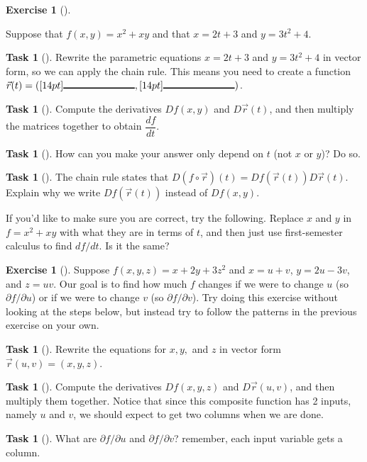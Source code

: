 \documentclass[10pt,]{book}
\theoremstyle{plain}
\theoremstyle{definition}
\theoremstyle{definition}
\theoremstyle{definition}
\theoremstyle{definition}
\newtheorem{exploration}[project]{Exercise}
\newtheorem{task}[project]{Task}
\theoremstyle{definition}
\numberwithin{equation}{section}
\newcommand{\blank}[1]{[14pt]{\rule{#1}{1pt}}}
\begin{document}
\begin{exploration}[]\label{exploration-154}
%
\par
Suppose that \(f(x,y) = x^2+xy\) and that \(x=2t+3\) and \(y=3t^2+4\).%
\begin{task}[]\label{task-357}
Rewrite the parametric equations \(x=2t+3\) and \(y=3t^2+4\) in vector form, so we can apply the chain rule. This means you need to create a function \(\vec r(t) = (\blank{1in}, \blank{1in})\).%
\end{task}
\begin{task}[]\label{task-358}
Compute the derivatives \(Df(x,y)\) and \(D\vec r(t)\), and then multiply the matrices together to obtain \(\dfrac{df}{dt}\).%
\end{task}
\begin{task}[]\label{task-359}
How can you make your answer only depend on \(t\) (not \(x\) or \(y\))? Do so.%
\end{task}
\begin{task}[]\label{task-360}
The chain rule states that \(D(f\circ \vec r)(t) = Df(\vec r(t))D\vec r(t)\). Explain why we write \(Df(\vec r(t))\) instead of \(Df(x,y)\).%
\end{task}
If you'd like to make sure you are correct, try the following. Replace \(x\) and \(y\) in \(f=x^2+xy\) with what they are in terms of \(t\), and then just use first-semester calculus to find \(df/dt\). Is it the same?%
\end{exploration}
\begin{exploration}[]\label{exploration-155}
Suppose \(f(x,y,z) = x+2y+3z^2\) and \(x=u+v\), \(y=2u-3v\), and \(z=uv\). Our goal is to find how much \(f\) changes if we were to change \(u\) (so \(\partial f/\partial u\)) or if we were to change \(v\) (so \(\partial f/\partial v\)). Try doing this exercise without looking at the steps below, but instead try to follow the patterns in the previous exercise on your own.%
\begin{task}[]\label{task-361}
Rewrite the equations for \(x,y,\) and \(z\) in vector form \(\vec r(u,v)=(x,y,z)\).%
\end{task}
\begin{task}[]\label{task-362}
Compute the derivatives \(Df(x,y,z)\) and \(D\vec r(u,v)\), and then multiply them together. Notice that since this composite function has 2 inputs, namely \(u\) and \(v\), we should expect to get two columns when we are done.%
\end{task}
\begin{task}[]\label{task-363}
What are \(\partial f/\partial u\) and \(\partial f/\partial v\)? remember, each input variable gets a column.%
%
\end{task}
\end{exploration}
\end{document}
